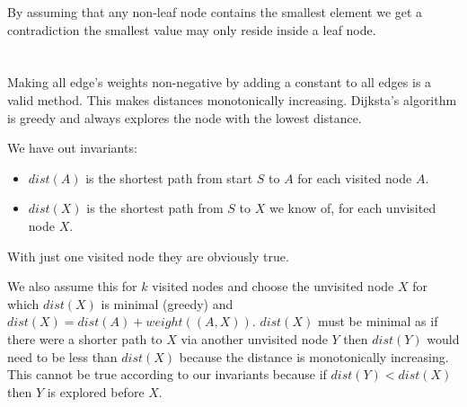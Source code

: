 \documentclass[12pt]{article}
\begin{document}
By assuming that any non-leaf node contains the smallest element we get a contradiction the smallest value may only reside inside a leaf node.

\section{} %
\section{} %
Making all edge's weights non-negative by adding a constant to all edges is a valid method. This makes distances monotonically increasing. Dijksta's algorithm is greedy and always explores the node with the lowest distance.

We have out invariants:
\begin{itemize}
	\item $dist(A)$ is the shortest path from start $S$ to $A$ for each visited node $A$.
	\item $dist(X)$ is the shortest path from $S$ to $X$ we know of, for each unvisited node $X$.
\end{itemize}

With just one visited node they are obviously true.

We also assume this for $k$ visited nodes and choose the unvisited node $X$ for which $dist(X)$ is minimal (greedy) and $dist(X) = dist(A) + weight((A, X))$. $dist(X)$ must be minimal as if there were a shorter path to $X$ via another unvisited node $Y$ then $dist(Y)$ would need to be less than $dist(X)$ because the distance is monotonically increasing. This cannot be true according to our invariants because if $dist(Y) < dist(X)$ then $Y$ is explored before $X$.
\end{document}
